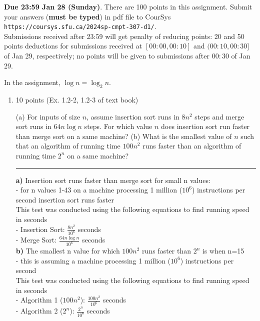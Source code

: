 \documentclass[letterpaper,12pt]{article}
\begin{document}

\pagestyle{myheadings}

\noindent
{\bf Due 23:59 Jan 28 (Sunday)}. There are 100 points in this assignment. 
Submit your answers ({\bf must be typed}) in pdf file to CourSys\\
{\tt https://coursys.sfu.ca/2024sp-cmpt-307-d1/}.\\
Submissions received after 23:59 will get penalty of reducing points: 20 and 50 points
deductions for submissions received at $[00:00,00:10]$ and $(00:10,00:30]$ of Jan 29,
respectively; no points will be given to submissions after $00:30$ of Jan 29.
 
\noindent In the assignment, $\log n=\log_2 n$.
\begin{enumerate}
\item 10 points (Ex. 1.2-2, 1.2-3 of text book) 

(a) For inputs of size $n$, assume insertion sort runs in $8n^2$ steps and merge
sort runs in $64n\log n$ steps. For which value $n$ does insertion sort run faster
than merge sort on a same machine?
(b) What is the smallest value of $n$ such that an algorithm of running time
$100n^2$ runs faster than an algorithm of running time $2^n$ on a same machine?
\\ \noindent\rule{16cm}{0.1pt}
\textbf{a)} Insertion sort runs faster than merge sort for small n values: \\
- for n values 1-43 on a machine processing 1 million (\(10^6\)) instructions per second insertion sort runs faster \\ 
This test was conducted using the following equations to find running speed in seconds \\
- Insertion Sort: \(\frac{8n^2}{10^{6}}\) seconds \\
- Merge Sort: \(\frac{64n\log n}{10^{6}}\) seconds \\
\textbf{b)} The smallest n value for which $100n^2$ runs faster than $2^n$ is when n=15 \\
- this is assuming a machine processing 1 million (\(10^6\)) instructions per second \\
This test was conducted using the following equations to find running speed in seconds \\
- Algorithm 1 ($100n^2$): \(\frac{100n^2}{10^{6}}\) seconds \\
- Algorithm 2 ($2^n$): \(\frac{2^n}{10^{6}}\) seconds \\


\end{enumerate}
\end{document}
